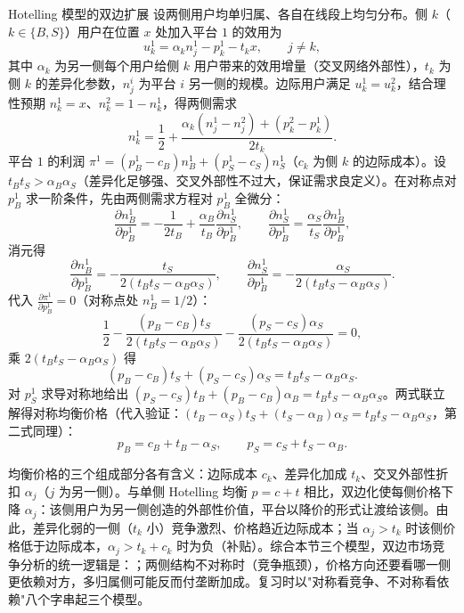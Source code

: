 \begin{derivation}{Hotelling 模型的双边扩展}{}
设两侧用户均单归属、各自在线段上均匀分布。侧 $k$（$k \in \{B,S\}$）用户在位置 $x$ 处加入平台 $1$ 的效用为
\[
u_k^1 = \alpha_k n_j^1 - p_k^1 - t_k x, \qquad j \ne k,
\]
其中 $\alpha_k$ 为另一侧每个用户给侧 $k$ 用户带来的效用增量（交叉网络外部性），$t_k$ 为侧 $k$ 的差异化参数，$n_j^i$ 为平台 $i$ 另一侧的规模。边际用户满足 $u_k^1 = u_k^2$，结合理性预期 $n_k^1 = x$、$n_k^2 = 1 - n_k^1$，得两侧需求
\[
n_k^1 = \frac12 + \frac{\alpha_k(n_j^1-n_j^2) + (p_k^2-p_k^1)}{2t_k}.
\]
平台 $1$ 的利润 $\pi^1 = (p_B^1-c_B)n_B^1 + (p_S^1-c_S)n_S^1$（$c_k$ 为侧 $k$ 的边际成本）。设 $t_Bt_S > \alpha_B\alpha_S$（差异化足够强、交叉外部性不过大，保证需求良定义）。在对称点对 $p_B^1$ 求一阶条件，先由两侧需求方程对 $p_B^1$ 全微分：
\[
\frac{\partial n_B^1}{\partial p_B^1} = -\frac{1}{2t_B} + \frac{\alpha_B}{t_B}\frac{\partial n_S^1}{\partial p_B^1}, \qquad
\frac{\partial n_S^1}{\partial p_B^1} = \frac{\alpha_S}{t_S}\frac{\partial n_B^1}{\partial p_B^1},
\]
消元得
\[
\frac{\partial n_B^1}{\partial p_B^1} = -\frac{t_S}{2(t_Bt_S-\alpha_B\alpha_S)}, \qquad
\frac{\partial n_S^1}{\partial p_B^1} = -\frac{\alpha_S}{2(t_Bt_S-\alpha_B\alpha_S)}.
\]
代入 $\frac{\partial\pi^1}{\partial p_B^1} = 0$（对称点处 $n_B^1 = 1/2$）：
\[
\frac12 - \frac{(p_B-c_B)t_S}{2(t_Bt_S-\alpha_B\alpha_S)} - \frac{(p_S-c_S)\alpha_S}{2(t_Bt_S-\alpha_B\alpha_S)} = 0,
\]
乘 $2(t_Bt_S-\alpha_B\alpha_S)$ 得
\[
(p_B-c_B)t_S + (p_S-c_S)\alpha_S = t_Bt_S-\alpha_B\alpha_S.
\]
对 $p_S^1$ 求导对称地给出 $(p_S-c_S)t_B + (p_B-c_B)\alpha_B = t_Bt_S-\alpha_B\alpha_S$。两式联立解得对称均衡价格（代入验证：$(t_B-\alpha_S)t_S + (t_S-\alpha_B)\alpha_S = t_Bt_S-\alpha_B\alpha_S$，第二式同理）：
\[
p_B = c_B + t_B - \alpha_S, \qquad p_S = c_S + t_S - \alpha_B.
\]
\end{derivation}

均衡价格的三个组成部分各有含义：边际成本 $c_k$、差异化加成 $t_k$、交叉外部性折扣 $\alpha_j$（$j$ 为另一侧）。与单侧 Hotelling 均衡 $p = c+t$ 相比，双边化使每侧价格下降 $\alpha_j$：该侧用户为另一侧创造的外部性价值，平台以降价的形式让渡给该侧。由此，差异化弱的一侧（$t_k$ 小）竞争激烈、价格趋近边际成本；当 $\alpha_j > t_k$ 时该侧价格低于边际成本，$\alpha_j > t_k + c_k$ 时为负（补贴）。综合本节三个模型，双边市场竞争分析的统一逻辑是：；两侧结构不对称时（竞争瓶颈），价格方向还要看哪一侧更依赖对方，多归属侧可能反而付垄断加成。复习时以"对称看竞争、不对称看依赖"八个字串起三个模型。

